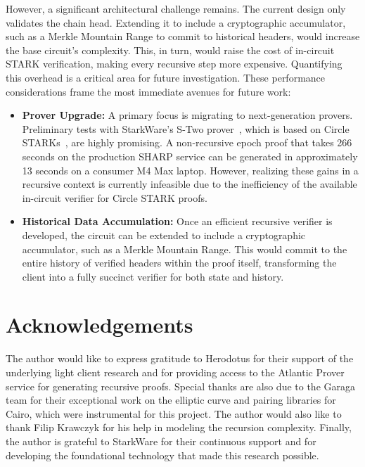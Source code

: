 \documentclass[runningheads]{llncs}
\begin{document}
However, a significant architectural challenge remains. The current design only validates the chain head. Extending it to include a cryptographic accumulator, such as a Merkle Mountain Range to commit to historical headers, would increase the base circuit's complexity. This, in turn, would raise the cost of in-circuit STARK verification, making every recursive step more expensive. Quantifying this overhead is a critical area for future investigation. These performance considerations frame the most immediate avenues for future work:

\begin{itemize}
    \item \textbf{Prover Upgrade:} A primary focus is migrating to next-generation provers. Preliminary tests with StarkWare's S-Two prover~\cite{StarkWare2025STwo}, which is based on Circle STARKs~\cite{Habock2024CircleSTARKs}, are highly promising. A non-recursive epoch proof that takes 266 seconds on the production SHARP service can be generated in approximately 13 seconds on a consumer M4 Max laptop. However, realizing these gains in a recursive context is currently infeasible due to the inefficiency of the available in-circuit verifier for Circle STARK proofs.
    
    \item \textbf{Historical Data Accumulation:} Once an efficient recursive verifier is developed, the circuit can be extended to include a cryptographic accumulator, such as a Merkle Mountain Range. This would commit to the entire history of verified headers within the proof itself, transforming the client into a fully succinct verifier for both state and history.
\end{itemize}

\section*{Acknowledgements}
The author would like to express gratitude to Herodotus for their support of the underlying light client research and for providing access to the Atlantic Prover service for generating recursive proofs. Special thanks are also due to the Garaga team for their exceptional work on the elliptic curve and pairing libraries for Cairo, which were instrumental for this project. The author would also like to thank Filip Krawczyk for his help in modeling the recursion complexity. Finally, the author is grateful to StarkWare for their continuous support and for developing the foundational technology that made this research possible.
\end{document}
